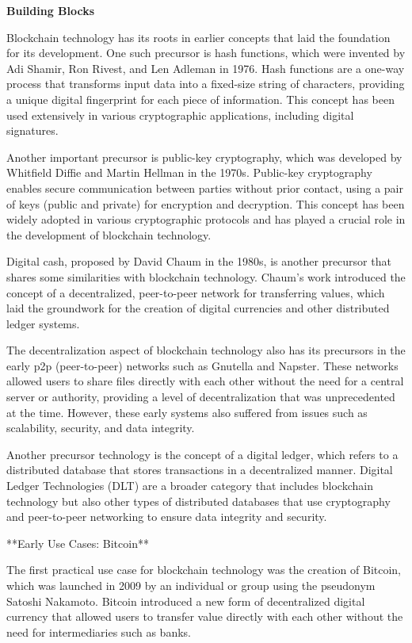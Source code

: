 \begin{documen}

\textbf{Building Blocks}

Blockchain technology has its roots in earlier concepts that laid the foundation for its development. One such precursor is hash functions, which were invented by Adi Shamir, Ron Rivest, and Len Adleman in 1976. Hash functions are a one-way process that transforms input data into a fixed-size string of characters, providing a unique digital fingerprint for each piece of information. This concept has been used extensively in various cryptographic applications, including digital signatures.

Another important precursor is public-key cryptography, which was developed by Whitfield Diffie and Martin Hellman in the 1970s. Public-key cryptography enables secure communication between parties without prior contact, using a pair of keys (public and private) for encryption and decryption. This concept has been widely adopted in various cryptographic protocols and has played a crucial role in the development of blockchain technology.

Digital cash, proposed by David Chaum in the 1980s, is another precursor that shares some similarities with blockchain technology. Chaum's work introduced the concept of a decentralized, peer-to-peer network for transferring values, which laid the groundwork for the creation of digital currencies and other distributed ledger systems.

The decentralization aspect of blockchain technology also has its precursors in the early p2p (peer-to-peer) networks such as Gnutella and Napster. These networks allowed users to share files directly with each other without the need for a central server or authority, providing a level of decentralization that was unprecedented at the time. However, these early systems also suffered from issues such as scalability, security, and data integrity.

Another precursor technology is the concept of a digital ledger, which refers to a distributed database that stores transactions in a decentralized manner. Digital Ledger Technologies (DLT) are a broader category that includes blockchain technology but also other types of distributed databases that use cryptography and peer-to-peer networking to ensure data integrity and security.

**Early Use Cases: Bitcoin**

The first practical use case for blockchain technology was the creation of Bitcoin, which was launched in 2009 by an individual or group using the pseudonym Satoshi Nakamoto. Bitcoin introduced a new form of decentralized digital currency that allowed users to transfer value directly with each other without the need for intermediaries such as banks.


\end{documen}
